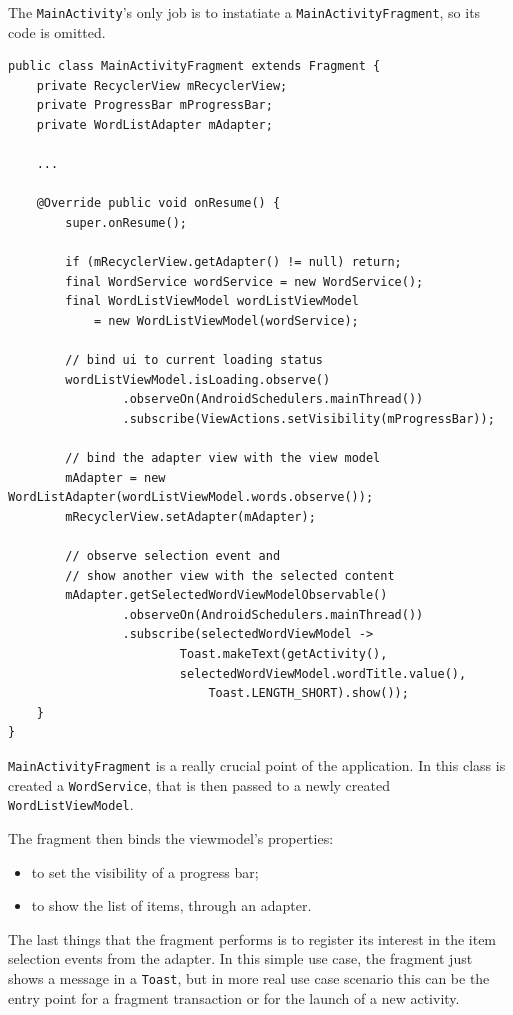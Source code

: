 The \texttt{MainActivity}'s only job is to instatiate a
\texttt{MainActivityFragment}, so its code is omitted.

\begin{verbatim}
public class MainActivityFragment extends Fragment {
    private RecyclerView mRecyclerView;
    private ProgressBar mProgressBar;
    private WordListAdapter mAdapter;

    ...

    @Override public void onResume() {
        super.onResume();

        if (mRecyclerView.getAdapter() != null) return; 
        final WordService wordService = new WordService();
        final WordListViewModel wordListViewModel 
        	= new WordListViewModel(wordService);

        // bind ui to current loading status
        wordListViewModel.isLoading.observe()
                .observeOn(AndroidSchedulers.mainThread())
                .subscribe(ViewActions.setVisibility(mProgressBar));

        // bind the adapter view with the view model
        mAdapter = new WordListAdapter(wordListViewModel.words.observe());
        mRecyclerView.setAdapter(mAdapter);

        // observe selection event and 
        // show another view with the selected content
        mAdapter.getSelectedWordViewModelObservable()
                .observeOn(AndroidSchedulers.mainThread())
                .subscribe(selectedWordViewModel ->
                        Toast.makeText(getActivity(),
                        selectedWordViewModel.wordTitle.value(), 
                        	Toast.LENGTH_SHORT).show());
    }
}
\end{verbatim}

\texttt{MainActivityFragment} is a really crucial point of the
application. In this class is created a \texttt{WordService}, that is
then passed to a newly created \texttt{WordListViewModel}.

The fragment then binds the viewmodel's properties:

\begin{itemize}
\itemsep1pt\parskip0pt
\item
  to set the visibility of a progress bar;
\item
  to show the list of items, through an adapter.
\end{itemize}

The last things that the fragment performs is to register its interest
in the item selection events from the adapter. In this simple use case,
the fragment just shows a message in a \texttt{Toast}, but in more real
use case scenario this can be the entry point for a fragment transaction
or for the launch of a new activity.


